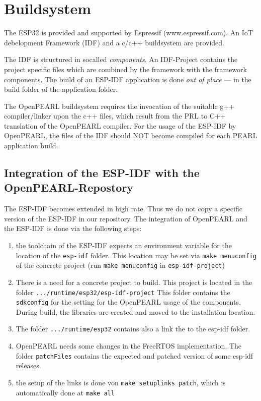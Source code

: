 \section{Buildsystem}

The ESP32 is provided and supported by Espressif (www.espressif.com).
An IoT debelopment Framework (IDF) and a c/c++ buildsystem are provided. 

The IDF is structured in socalled {\em components}. An IDF-Project contains
the project specific files which are combined by the framework with the 
framework components. The build of an ESP-IDF application is done 
{\em out of place} --- in the build folder of the application folder.

The OpenPEARL buildsystem requires the invocation of the suitable 
g++ compiler/linker upon the c++ files, which result from the PRL to C++ 
translation of the OpenPEARL compiler.
For the usage of the ESP-IDF by OpenPEARL, the files of the IDF should NOT 
become compiled for each PEARL application build.

\subsection{Integration of the ESP-IDF with the OpenPEARL-Repostory}
The ESP-IDF becomes extended in high rate. Thus we do not copy a specific
version of the ESP-IDF in our repository.
The integration of OpenPEARL and the ESP-IDF is done via the following steps:
\begin{enumerate}
\item the toolchain of the ESP-IDF expects an environment variable
   for the location of the \texttt{esp-idf} folder.
   This location may be set via \texttt{make menuconfig}
   of the concrete project 
   (run \texttt{make menuconfig} in \texttt{esp-idf-project}) 
\item There is a need for a concrete project to build.
   This project is located in the folder \texttt{.../runtime/esp32/esp-idf-project}
   This folder contains the \texttt{sdkconfig} for the setting for the 
   OpenPEARL usage of the components. During build, the libraries are created and moved to
   the installation location.
\item The folder \texttt{.../runtime/esp32} contains also a link the
  to the esp-idf folder.
\item OpenPEARL needs some changes in the FreeRTOS implementation.
  The folder \texttt{patchFiles} contains the expected and patched 
  version of some esp-idf releases.
\item the setup of the links is done von \texttt{make setuplinks patch},
   which is automatically done at \texttt{make all} 
\end{enumerate}

